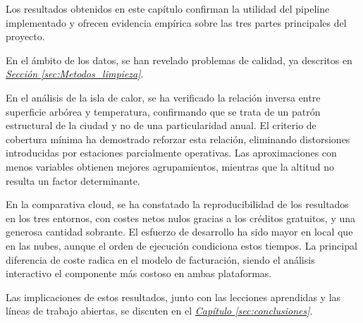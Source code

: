 Los resultados obtenidos en este capítulo confirman la utilidad del pipeline implementado y ofrecen evidencia empírica sobre las tres partes principales del proyecto.

En el ámbito de los datos, se han revelado problemas de calidad, ya descritos en \hyperref[sec:Metodos_limpieza]{\textit{Sección \ref*{sec:Metodos_limpieza}}}.

En el análisis de la isla de calor, se ha verificado la relación inversa entre superficie arbórea y temperatura, confirmando que se trata de un patrón estructural de la ciudad y no de una particularidad anual. El criterio de cobertura mínima ha demostrado reforzar esta relación, eliminando distorsiones introducidas por estaciones parcialmente operativas. Las aproximaciones con menos variables obtienen mejores agrupamientos, mientras que la altitud no resulta un factor determinante.

En la comparativa cloud, se ha constatado la reproducibilidad de los resultados en los tres entornos, con costes netos nulos gracias a los créditos gratuitos, y una generosa cantidad sobrante. El esfuerzo de desarrollo ha sido mayor en local que en las nubes, aunque el orden de ejecución condiciona estos tiempos. La principal diferencia de coste radica en el modelo de facturación, siendo el análisis interactivo el componente más costoso en ambas plataformas.

Las implicaciones de estos resultados, junto con las lecciones aprendidas y las líneas de trabajo abiertas, se discuten en el \hyperref[sec:conclusiones]{\textit{Capítulo \ref*{sec:conclusiones}}}.
